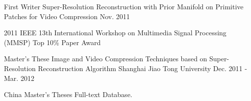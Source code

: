

\begin{cventries}

  \cventry
    {First Writer} %
    {Super-Resolution Reconstruction with Prior Manifold on Primitive Patches for Video Compression} %
    {} %
    {Nov. 2011} %
    {
      \begin{cvitems} %
        \item {2011 IEEE 13th International Workshop on Multimedia Signal Processing (MMSP) Top 10\% Paper Award}
      \end{cvitems}
    }

  \cventry
    {Master's These} %
    {Image and Video Compression Techniques based on Super-Resolution Reconstruction Algorithm} %
    {Shanghai Jiao Tong University} %
    {Dec. 2011 - Mar. 2012} %
    {
      \begin{cvitems} %
        \item {China Master’s Theses Full-text Database.}
      \end{cvitems}
    }

\end{cventries}
